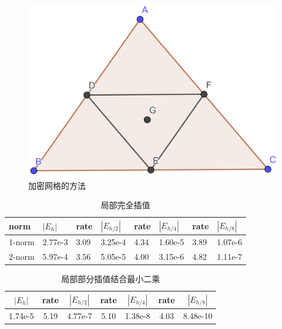 \begin{figure}[H]
  \centering
  \includegraphics[width=0.35\linewidth]{fig/tri}
  \caption{加密网格的方法}
\end{figure}
\begin{table}[htbp]
  \begin{center}  
    \begin{tabular}{|l|l|l|l|l|l|l|l|}  
      \hline  
      norm & $|E_h|$ & rate & $|E_{h/2}|$ & rate& $|E_{h/4}|$ &rate &$|E_{h/8}|$ \\
      \hline            
      1-norm & 2.77e-3 & 3.09 & 3.25e-4 & 4.34& 1.60e-5 & 3.89&1.07e-6 \\
      \hline
      2-norm & 5.97e-4 & 3.56 & 5.05e-5 & 4.00& 3.15e-6 & 4.82&1.11e-7 \\
      \hline  
    \end{tabular}  
  \end{center}  
  \caption{局部完全插值}  
\end{table}
\begin{table}[h]
  \centering
  \begin{tabular}{|c|c|c|c|c|c|c|}
    \hline
    $|E_h|$ & rate & $|E_{h/2}|$ & rate& $|E_{h/4}|$&rate&$|E_{h/8}|$\\ 
    \hline
    1.74e-5& 5.19& 4.77e-7& 5.10& 1.38e-8& 4.03& 8.48e-10\\ 
    \hline
  \end{tabular}
  \caption{局部部分插值结合最小二乘}
\end{table}
